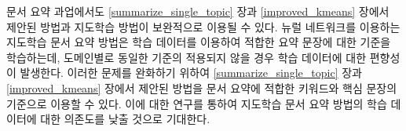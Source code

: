 \documentclass[oneside, ko,phd]{snuthesis_utf8_kor}
\begin{document}
문서 요약 과업에서도 \ref{summarize_single_topic} 장과 \ref{improved_kmeans} 장에서 제안된 방법과 지도학습 방법이 보완적으로 이용될 수 있다.
뉴럴 네트워크를 이용하는 지도학습 문서 요약 방법은 학습 데이터를 이용하여 적합한 요약 문장에 대한 기준을 학습하는데, 도메인별로 동일한 기준의 적용되지 않을 경우 학습 데이터에 대한 편향성이 발생한다.
이러한 문제를 완화하기 위하여 \ref{summarize_single_topic} 장과 \ref{improved_kmeans} 장에서 제안된 방법을 문서 요약에 적합한 키워드와 핵심 문장의 기준으로 이용할 수 있다.
이에 대한 연구를 통하여 지도학습 문서 요약 방법의 학습 데이터에 대한 의존도를 낮출 것으로 기대한다.

\begin{bibpage}


\nocite{*}
\end{bibpage}
\end{document}
